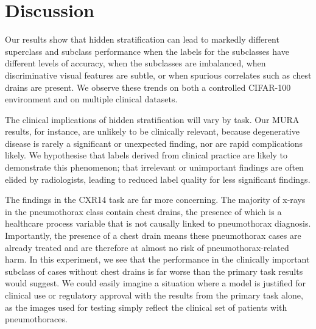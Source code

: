\documentclass{article}
\begin{document}
%

\section{Discussion}

Our results show that hidden stratification can lead to markedly different superclass and subclass performance when the labels for the subclasses have different levels of accuracy, when the subclasses are imbalanced, when discriminative visual features are subtle, or when spurious correlates such as chest drains are present.
We observe these trends on both a controlled CIFAR-100 environment and on multiple clinical datasets.

The clinical implications of hidden stratification will vary by task. 
Our MURA results, for instance, are unlikely to be clinically relevant, because degenerative disease is rarely a significant or unexpected finding, nor are rapid complications likely. 
We hypothesise that labels derived from clinical practice are likely to demonstrate this phenomenon; that irrelevant or unimportant findings are often elided by radiologists, leading to reduced label quality for less significant findings.

The findings in the CXR14 task are far more concerning. 
The majority of x-rays in the pneumothorax class contain chest drains, the presence of which is a healthcare process variable that is not causally linked to pneumothorax diagnosis.
 Importantly, the presence of a chest drain means these pneumothorax cases are already treated and are therefore at almost no risk of pneumothorax-related harm. 
 In this experiment, we see that the performance in the clinically important subclass of cases without chest drains is far worse than the primary task results would suggest. 
 We could easily imagine a situation where a model is justified for clinical use or regulatory approval with the results from the primary task alone, as the images used for testing simply reflect the clinical set of patients with pneumothoraces.
 
\end{document}
